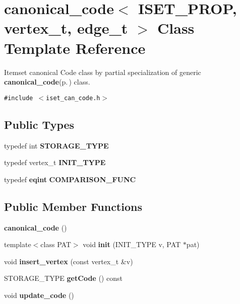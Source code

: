 \section{canonical\_\-code$<$ ISET\_\-PROP, vertex\_\-t, edge\_\-t $>$ Class Template Reference}
\label{classcanonical__code_3_01ISET__PROP_00_01vertex__t_00_01edge__t_01_4}
Itemset canonical Code class by partial specialization of generic {\bf canonical\_\-code}{\rm (p.\,\pageref{classcanonical__code})} class.  


{\tt \#include $<$iset\_\-can\_\-code.h$>$}

\subsection*{Public Types}
\begin{CompactItemize}
\item 
typedef int {\bf STORAGE\_\-TYPE}\label{classcanonical__code_3_01ISET__PROP_00_01vertex__t_00_01edge__t_01_4_w0}

\item 
typedef vertex\_\-t {\bf INIT\_\-TYPE}\label{classcanonical__code_3_01ISET__PROP_00_01vertex__t_00_01edge__t_01_4_w1}

\item 
typedef {\bf eqint} {\bf COMPARISON\_\-FUNC}\label{classcanonical__code_3_01ISET__PROP_00_01vertex__t_00_01edge__t_01_4_w2}

\end{CompactItemize}
\subsection*{Public Member Functions}
\begin{CompactItemize}
\item 
{\bf canonical\_\-code} ()\label{classcanonical__code_3_01ISET__PROP_00_01vertex__t_00_01edge__t_01_4_a0}

\item 
template$<$class PAT$>$ void {\bf init} (INIT\_\-TYPE v, PAT $\ast$pat)
\item 
void {\bf insert\_\-vertex} (const  vertex\_\-t \&v)
\item 
STORAGE\_\-TYPE {\bf get\-Code} () const 
\item 
void {\bf update\_\-code} ()\label{classcanonical__code_3_01ISET__PROP_00_01vertex__t_00_01edge__t_01_4_a4}

\end{CompactItemize}


